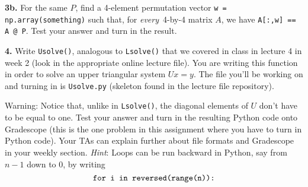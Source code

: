 \documentclass[11pt]{article}
\begin{document}
\par\medskip
\textbf {3b.} For the same $P$, 
find a 4-element permutation vector {\tt w = np.array(something)}
such that, for {\em every}\, 4-by-4 matrix $A$, 
we have {\tt A[:,w] == A @ P}. 
Test your answer and turn in the result.

\par\bigskip
\textbf {4.}
Write {\tt Usolve()}, analogous to {\tt Lsolve()} that we covered in class in lecture 4 in week 2 (look in the appropriate online lecture file). You are writing this function in order to solve an upper triangular system $Ux=y$. The file you'll be working on and turning in is {\tt Usolve.py} (skeleton found in the lecture file repository). 

Warning: Notice that, unlike in {\tt Lsolve()}, 
the diagonal elements of $U$ don't have to be equal to one.
Test your answer and turn in the resulting Python code onto Gradescope (this is the one problem in this assignment where you have to turn in Python code). Your TAs can explain further about file formats and Gradescope in your weekly section.
\textit{Hint}: Loops can be run backward in Python, 
say from $n-1$ down to $0$, by writing
$$\mbox{\tt for i in reversed(range(n)):}$$
\end{document}
